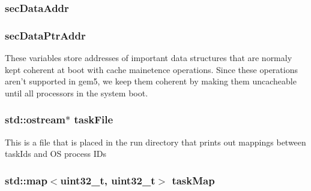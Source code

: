 \label{classLinuxArmSystem_a38de836fdda5d23ffd25ffbd1a1faa74}
\hypertarget{classLinuxArmSystem_a6c059b006ceb752c5e6b2e1d90b54e33}{
\subsubsection[{secDataAddr}]{ {\bf secDataAddr}}}
\label{classLinuxArmSystem_a6c059b006ceb752c5e6b2e1d90b54e33}
\hypertarget{classLinuxArmSystem_adfcef8a6e43803757c1e941c5005ad36}{
\subsubsection[{secDataPtrAddr}]{ {\bf secDataPtrAddr}}}
\label{classLinuxArmSystem_adfcef8a6e43803757c1e941c5005ad36}
These variables store addresses of important data structures that are normaly kept coherent at boot with cache mainetence operations. Since these operations aren't supported in gem5, we keep them coherent by making them uncacheable until all processors in the system boot. \hypertarget{classLinuxArmSystem_aade5b03480aa42a0aab017e273e847a1}{
\subsubsection[{taskFile}]{\setlength{\rightskip}{0pt plus 5cm}std::ostream$\ast$ {\bf taskFile}}}
\label{classLinuxArmSystem_aade5b03480aa42a0aab017e273e847a1}
This is a file that is placed in the run directory that prints out mappings between taskIds and OS process IDs \hypertarget{classLinuxArmSystem_af0a9621b833015091de5c531ad29b078}{
\subsubsection[{taskMap}]{\setlength{\rightskip}{0pt plus 5cm}std::map$<${\bf uint32\_\-t}, {\bf uint32\_\-t}$>$ {\bf taskMap}}}
